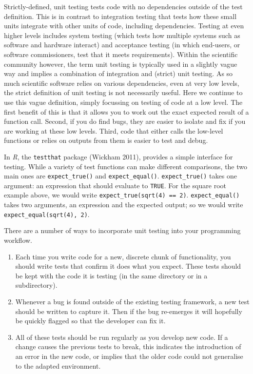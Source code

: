 \documentclass[]{elsarticle} %
\providecommand{\tightlist}{%
  \setlength{\itemsep}{0pt}\setlength{\parskip}{0pt}}
\begin{document}
Strictly-defined, unit testing tests code with no dependencies outside of the test definition.
This is in contrast to integration testing that tests how these small units integrate with other units of code, including dependencies.
Testing at even higher levels includes system testing (which tests how multiple systems such as software and hardware interact) and acceptance testing (in which end-users, or software commissioners, test that it meets requirements).
Within the scientific community however, the term unit testing is typically used in a slightly vague way and implies a combination of integration and (strict) unit testing.
As so much scientific software relies on various dependencies, even at very low levels, the strict definition of unit testing is not necessarily useful.
Here we continue to use this vague definition, simply focussing on testing of code at a low level.
The first benefit of this is that it allows you to work out the exact expected result of a function call.
Second, if you do find bugs, they are easier to isolate and fix if you are working at these low levels.
Third, code that either calls the low-level functions or relies on outputs from them is easier to test and debug.

In \emph{R}, the \texttt{testthat} package (Wickham 2011), provides a simple interface for testing.
While a variety of test functions can make different comparisons, the two main ones are \texttt{expect\_true()} and \texttt{expect\_equal()}.
\texttt{expect\_true()} takes one argument: an expression that should evaluate to \texttt{TRUE}.
For the square root example above, we would write \texttt{expect\_true(sqrt(4)\ ==\ 2)}.
\texttt{expect\_equal()} takes two arguments, an expression and the expected output;
so we would write \texttt{expect\_equal(sqrt(4),\ 2)}.

There are a number of ways to incorporate unit testing into your programming workflow.

\begin{enumerate}
\def\labelenumi{\arabic{enumi}.}
\tightlist
\item
  Each time you write code for a new, discrete chunk of functionality, you should write tests that confirm it does what you expect. These tests should be kept with the code it is testing (in the same directory or in a subdirectory).
\item
  Whenever a bug is found outside of the existing testing framework, a new test should be written to capture it.
  Then if the bug re-emerges it will hopefully be quickly flagged so that the developer can fix it.
\item
  All of these tests should be run regularly as you develop new code.
  If a change causes the previous tests to break, this indicates the introduction of an error in the new code, or implies that the older code could not generalise to the adapted environment.
\end{enumerate}
\end{document}
